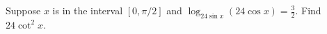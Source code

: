 Suppose $x$ is in the interval $[0,\pi/2]$ and $\log_{24\sin{x}}(24\cos{x})=\frac{3}{2}$.
Find $24\cot^2{x}$.